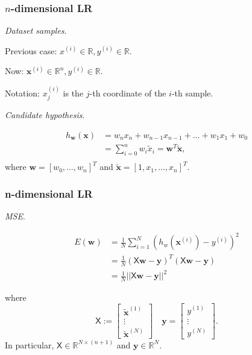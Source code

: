 \documentclass{beamer}
\begin{document}
	\begin{frame}
		\frametitle{$n$-dimensional LR}
		\textsl{Dataset samples}.
		
		Previous case: $x^{(i)} \in \mathbb{R}, y^{(i)} \in \mathbb{R}$.
		
		\vspace{1 mm}
		
		Now:  $\bm{x}^{(i)} \in \mathbb{R}^n, y^{(i)} \in \mathbb{R}$.
		
		Notation: $x^{(i)}_j$ is the $j$-th coordinate of the $i$-th sample.
		
		\vspace{5 mm}
		
		\textsl{Candidate hypothesis}.
		
		\begin{align*}
			h_{\bm{w}}(\bm{x}) &= w_{n}x_n + w_{n-1}x_{n-1} + \dots + w_1 x_1 + w_0\\
			&= \sum_{i=0}^n w_i \tilde{x}_i = \bm{w}^T \tilde{\bm{x}},\\
		\end{align*}
		where $\bm{w} = [w_0, \dots, w_n]^T$ and $\tilde{\bm{x}} = [1, x_1, \dots, x_n]^T$.
		
	\end{frame}

	\begin{frame}
		\frametitle{n-dimensional LR}
		\textsl{MSE}.
		
		\begin{align*}
			E(\bm{w}) &= \frac{1}{N} \sum_{i=1}^{N} (h_w(\bm{x}^{(i)}) - y^{(i)})^2\\
			&= \frac{1}{N} (\mathsf{X} \bm{w} - \bm{y})^T (\mathsf{X}\bm{w} - \bm{y})\\
			&= \frac{1}{N} ||\mathsf{X}\bm{w} - \bm{y}||^2
		\end{align*}
		
		where
		\begin{equation*}
			\mathsf{X} := \begin{bmatrix}
				\tilde{\bm{x}}^{(1)}\\
				\vdots\\
				\tilde{\bm{x}}^{(N)}
			\end{bmatrix} \quad \bm{y} = \begin{bmatrix}
			y^{(1)} \\
			\vdots\\
			y^{(N)}
		\end{bmatrix}.
		\end{equation*}
	In particular, $\mathsf{X} \in \mathbb{R}^{N \times (n+1)}$ and $\bm{y} \in \mathbb{R}^N$.
	\end{frame}
\end{document}
